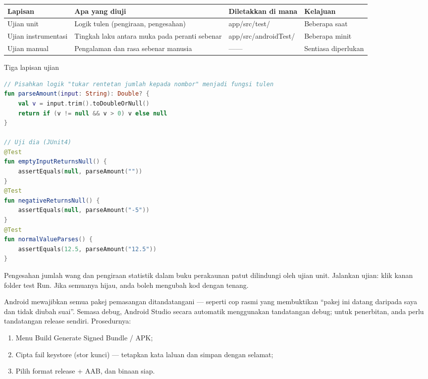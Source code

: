 \begin{center}
\begin{tabularx}{\linewidth}{|X|X|X|X|}
\hline
\textbf{Lapisan} & \textbf{Apa yang diuji} & \textbf{Diletakkan di mana} & \textbf{Kelajuan} \tabularnewline
\hline
Ujian unit & Logik tulen (pengiraan, pengesahan) & app/src/test/ & Beberapa saat \tabularnewline
Ujian instrumentasi & Tingkah laku antara muka pada peranti sebenar & app/src/androidTest/ & Beberapa minit \tabularnewline
Ujian manual & Pengalaman dan rasa sebenar manusia & —— & Sentiasa diperlukan \tabularnewline
\hline
\end{tabularx}
\end{center}

\begin{center}\small\color{gray}Tiga lapisan ujian\end{center}

\begin{lstlisting}[language=Kotlin]
// Pisahkan logik "tukar rentetan jumlah kepada nombor" menjadi fungsi tulen
fun parseAmount(input: String): Double? {
    val v = input.trim().toDoubleOrNull()
    return if (v != null && v > 0) v else null
}

// Uji dia (JUnit4)
@Test
fun emptyInputReturnsNull() {
    assertEquals(null, parseAmount(""))
}
@Test
fun negativeReturnsNull() {
    assertEquals(null, parseAmount("-5"))
}
@Test
fun normalValueParses() {
    assertEquals(12.5, parseAmount("12.5"))
}
\end{lstlisting}

Pengesahan jumlah wang dan pengiraan statistik dalam buku perakaunan patut dilindungi oleh ujian unit. Jalankan ujian: klik kanan folder test Run. Jika semuanya hijau, anda boleh mengubah kod dengan tenang.


Android mewajibkan semua pakej pemasangan ditandatangani — seperti cop rasmi yang membuktikan “pakej ini datang daripada saya dan tidak diubah suai”. Semasa debug, Android Studio secara automatik menggunakan tandatangan debug; untuk penerbitan, anda perlu tandatangan release sendiri. Prosedurnya:

\begin{enumerate}
  \item Menu Build Generate Signed Bundle / APK;
  \item Cipta fail keystore (stor kunci) — tetapkan kata laluan dan simpan dengan selamat;
  \item Pilih format release + AAB, dan binaan siap.
\end{enumerate}

